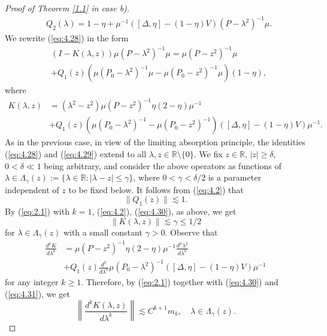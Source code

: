 \documentclass[11pt]{amsart}
\numberwithin{equation}{section}
\def\R{{\mathbb R}}
\begin{document}
\begin{proof}[Proof of Theorem \ref{1.1} in case b)]
\begin{align*}
& Q_2(\lambda)=1-\eta+\mu^{-1}([\Delta,\eta]-(1-\eta)V)(P-\lambda^2)^{-1}\mu.
 \end{align*}
 We rewrite (\ref{eq:4.28}) in the form
 \begin{equation}\label{eq:4.29}
 \begin{split}
 &(I-K(\lambda,z))\mu(P-\lambda^2)^{-1}\mu=\mu(P-z^2)^{-1}\mu\\
 &+Q_1(z)(\mu(P_0-\lambda^2)^{-1}\mu-\mu(P_0-z^2)^{-1}\mu)(1-\eta),
 \end{split}
 \end{equation}
 where 
 \begin{equation*}
 \begin{split}
 K(\lambda,z)&=(\lambda^2-z^2)\mu(P-z^2)^{-1}\eta(2-\eta)\mu^{-1}\\
 &+Q_1(z)(\mu(P_0-\lambda^2)^{-1}-\mu(P_0-z^2)^{-1})([\Delta,\eta]-(1-\eta)V)\mu^{-1}.
 \end{split}
 \end{equation*}
 As in the previous case, in view of the limiting absorption principle, the identities (\ref{eq:4.28}) and (\ref{eq:4.29}) extend to all $\lambda,z\in\R\setminus \{0\}$. We fix $z\in\R$, $|z|\ge\delta$, $0<\delta\ll 1$ being arbitrary, and consider the above operators as functions of $\lambda\in\Lambda_\gamma(z):=\{\lambda\in\R:|\lambda-z|\le\gamma\}$, where $0<\gamma<\delta/2$ is a parameter
independent of $z$ to be fixed below.
It follows from (\ref{eq:4.2}) that
\begin{equation}\label{eq:4.30}
\|Q_1(z)\|\lesssim 1.
\end{equation}
By (\ref{eq:2.1}) with $k=1$, (\ref{eq:4.2}), (\ref{eq:4.30}), as above, we get
\begin{equation}\label{eq:4.31}
\|K(\lambda,z)\|\lesssim \gamma\le 1/2
\end{equation}
for $\lambda\in\Lambda_\gamma(z)$ with a small constant $\gamma>0$. Observe that
\begin{equation*}
 \begin{split}
\frac{d^kK}{d\lambda^k}&=\mu(P-z^2)^{-1}\eta(2-\eta)\mu^{-1}\frac{d^k\lambda^2}{d\lambda^k}\\
 &+Q_1(z)\frac{d^k}{d\lambda^k}\mu(P_0-\lambda^2)^{-1}([\Delta,\eta]-(1-\eta)V)\mu^{-1}
 \end{split}
 \end{equation*}
 for any integer $k\ge 1$. Therefore, by (\ref{eq:2.1}) together with (\ref{eq:4.30}) and (\ref{eq:4.31}), we get
\begin{equation}\label{eq:4.32}
\left\|\frac{d^kK(\lambda,z)}{d\lambda^k}\right\|\lesssim C^{k+1}m_k,\quad \lambda\in\Lambda_\gamma(z).

\end{equation}
\end{proof}
\end{document}
